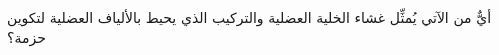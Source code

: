 
\begin{question}

\begin{instance}

\begin{mcq}[standalone=false]

\begin{stem}
أيٌّ من الآتي يُمثِّل غشاء الخلية العضلية والتركيب الذي يحيط بالألياف العضلية لتكوين حزمة؟ \par

\end{stem}

\begin{distractors}
        
\end{distractors}

\end{mcq}

\end{instance}

\end{question}
